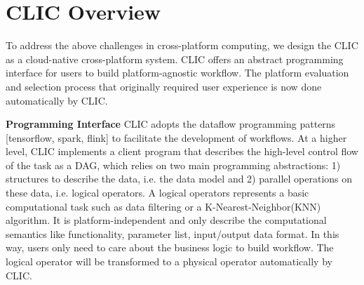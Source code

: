 \section{CLIC Overview}
To address the above challenges in cross-platform computing, we design the CLIC as a cloud-native cross-platform system. 
CLIC offers an abstract programming interface for users to build platform-agnostic workflow.
The platform evaluation and selection process that originally required user experience is now done automatically by CLIC.

\textbf{Programming Interface} 
CLIC adopts the dataflow programming patterns [tensorflow, spark, flink] to facilitate the development of workflows. 
At a higher level, CLIC implements a client program that describes the high-level control flow of the task as a DAG, which relies on two main programming abstractions:
1) structures to describe the data, i.e. the data model and 2) parallel operations on these data, i.e. logical operators.
A logical operators represents a basic computational task such as data filtering or a K-Nearest-Neighbor(KNN) algorithm.
It is platform-independent and only describe the computational semantics like functionality, parameter list, input/output data format.
In this way, users only need to care about the business logic to build workflow.
The logical operator will be transformed to a physical operator automatically by CLIC.




